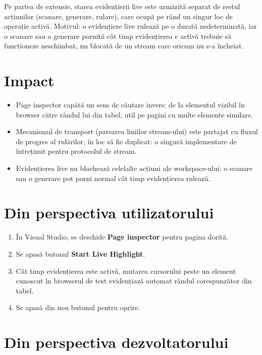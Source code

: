 \documentclass[12pt,a4paper]{report}
\newcommand{\UI}[1]{\textbf{#1}}
\begin{document}
Pe partea de extensie, starea evidențierii live este urmărită separat de restul acțiunilor (scanare, generare, rulare), care ocupă pe rând un singur loc de operație activă. Motivul: o evidențiere live rulează pe o durată nedeterminată, iar o scanare sau o generare pornită cât timp evidențierea e activă trebuie să funcționeze neschimbat, nu blocată de un stream care oricum nu s-a încheiat.

\section{Impact}

\begin{itemize}
  \item Page inspector capătă un sens de căutare invers: de la elementul vizibil în browser către rândul lui din tabel, util pe pagini cu multe elemente similare.
  \item Mecanismul de transport (parsarea liniilor stream-ului) este partajat cu fluxul de progres al rulărilor, în loc să fie duplicat: o singură implementare de întreținut pentru protocolul de stream.
  \item Evidențierea live nu blochează celelalte acțiuni ale workspace-ului: o scanare sau o generare pot porni normal cât timp evidențierea rulează.
\end{itemize}

\section{Din perspectiva utilizatorului}

\begin{enumerate}
  \item În Visual Studio, se deschide \UI{Page inspector} pentru pagina dorită.
  \item Se apasă butonul \UI{Start Live Highlight}.
  \item Cât timp evidențierea este activă, mutarea cursorului peste un element cunoscut în browserul de test evidențiază automat rândul corespunzător din tabel.
  \item Se apasă din nou butonul pentru oprire.
\end{enumerate}

\section{Din perspectiva dezvoltatorului}
\end{document}
